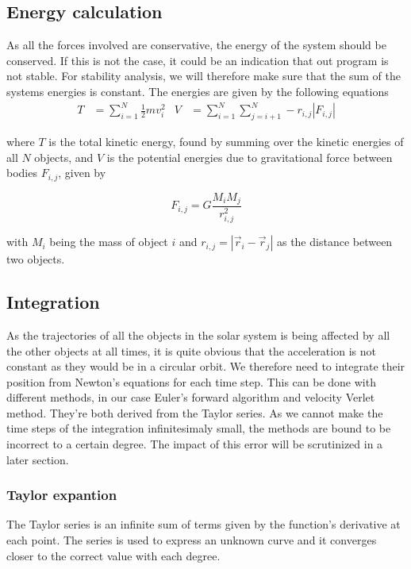 \documentclass[10pt]{article}
\begin{document}
\begin{multicols}{2}
\subsection{Energy calculation}
As all the forces involved are conservative, the energy of the system should be conserved. If this is not the case, it could be an indication that out program is not stable. For stability analysis, we will therefore make sure that the sum of the systems energies is constant. The energies are given by the following equations 
\begin{align}\label{eq:energies}
    T &= \sum_{i=1}^N \frac{1}{2}mv_i^2 & V &= \sum_{i=1}^N \sum_{j=i+1}^N
    -r_{i,j}|F_{i,j}|
\end{align}

where $T$ is the total kinetic energy, found by summing over the kinetic
energies of all $N$ objects, and $V$ is the potential energies due to
gravitational force between bodies $F_{i,j}$, given by

\begin{equation}
    F_{i,j} =  G\frac{M_iM_j}{r_{i,j}^2}
\end{equation}

with $M_i$ being the mass of object $i$ and $r_{i,j} = |\vec r_i - \vec
r_j|$ as the distance between two objects.


\subsection{Integration}
As the trajectories of all the objects in the solar system is being
affected by all the other objects at all times, it is quite obvious that
the acceleration is not constant as they would be in a circular orbit. We
therefore need to integrate their position from Newton's equations for each
time step. This can be done with different methods, in our case Euler's
forward algorithm and velocity Verlet method. They're both derived from the
Taylor series. As we cannot make the time steps of the integration
infinitesimaly small, the methods are bound to be incorrect to a certain
degree. The impact of this error will be scrutinized in a later section.

\subsubsection{Taylor expantion}
The Taylor series is an infinite sum of terms given by the function's
derivative at each point. The series is used to express an unknown
curve and it converges closer to the correct value with each degree. 


\end{multicols}
\end{document}
